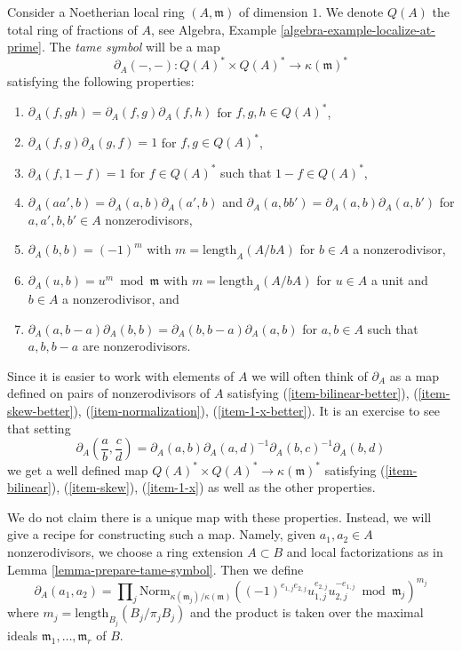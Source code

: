 \noindent
Consider a Noetherian local ring $(A, \mathfrak m)$ of dimension $1$.
We denote $Q(A)$ the total ring of fractions of $A$, see
Algebra, Example \ref{algebra-example-localize-at-prime}.
The {\it tame symbol} will be a map
$$
\partial_A(-, -) : Q(A)^* \times Q(A)^* \longrightarrow \kappa(\mathfrak m)^*
$$
satisfying the following properties:
\begin{enumerate}
\item $\partial_A(f, gh) = \partial_A(f, g) \partial_A(f, h)$
\label{item-bilinear}
for $f, g, h \in Q(A)^*$,
\item $\partial_A(f, g) \partial_A(g, f) = 1$
\label{item-skew}
for $f, g \in Q(A)^*$,
\item $\partial_A(f, 1 - f) = 1$
\label{item-1-x}
for $f \in Q(A)^*$ such that $1 - f \in Q(A)^*$,
\item $\partial_A(aa', b) = \partial_A(a, b)\partial_A(a', b)$
\label{item-bilinear-better}
and $\partial_A(a, bb') = \partial_A(a, b)\partial_A(a, b')$
for $a, a', b, b' \in A$ nonzerodivisors,
\item $\partial_A(b, b) = (-1)^m$
\label{item-skew-better}
with $m = \text{length}_A(A/bA)$
for $b \in A$ a nonzerodivisor,
\item $\partial_A(u, b) = u^m \bmod \mathfrak m$
\label{item-normalization}
with $m = \text{length}_A(A/bA)$ for $u \in A$ a unit and
$b \in A$ a nonzerodivisor, and
\item
\label{item-1-x-better}
$\partial_A(a, b - a)\partial_A(b, b) = \partial_A(b, b - a)\partial_A(a, b)$
for $a, b \in A$ such that $a, b, b - a$ are nonzerodivisors.
\end{enumerate}
Since it is easier to work with elements of $A$ we will
often think of $\partial_A$ as a map defined on pairs of
nonzerodivisors of $A$ satisfying (\ref{item-bilinear-better}),
(\ref{item-skew-better}), (\ref{item-normalization}),
(\ref{item-1-x-better}). It is an exercise to see that
setting
$$
\partial_A(\frac{a}{b}, \frac{c}{d}) =
\partial_A(a, b) \partial_A(a, d)^{-1} \partial_A(b, c)^{-1} \partial_A(b, d)
$$
we get a well defined map $Q(A)^* \times Q(A)^* \to \kappa(\mathfrak m)^*$
satisfying (\ref{item-bilinear}), (\ref{item-skew}), (\ref{item-1-x})
as well as the other properties.

\medskip\noindent
We do not claim there is a unique map with these properties.
Instead, we will give a recipe for constructing such a map.
Namely, given $a_1, a_2 \in A$ nonzerodivisors, we choose
a ring extension $A \subset B$ and local factorizations
as in Lemma \ref{lemma-prepare-tame-symbol}.
Then we define
\begin{equation}
\label{equation-tame-symbol}
\partial_A(a_1, a_2) = \prod\nolimits_j
\text{Norm}_{\kappa(\mathfrak m_j)/\kappa(\mathfrak m)}
((-1)^{e_{1, j}e_{2, j}}u_{1, j}^{e_{2, j}}u_{2, j}^{-e_{1, j}}
\bmod \mathfrak m_j)^{m_j}
\end{equation}
where $m_j = \text{length}_{B_j}(B_j/\pi_j B_j)$ and the product
is taken over the maximal ideals $\mathfrak m_1, \ldots, \mathfrak m_r$ of $B$.


